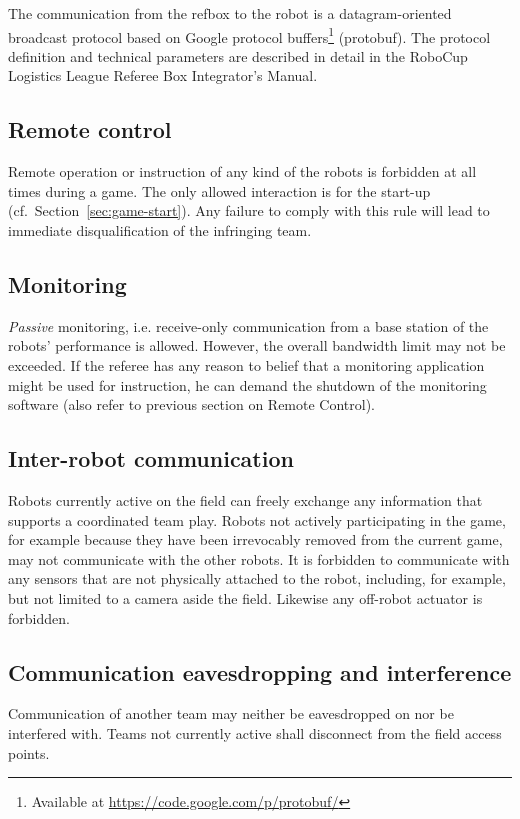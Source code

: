 \documentclass[12pt,twoside]{article}
\newcommand{\refsec}[1]{Section~\ref{#1}}
\begin{document}
The communication from the refbox to the robot is a datagram-oriented
broadcast protocol based on Google protocol buffers\footnote{Available
  at \url{https://code.google.com/p/protobuf/}} (protobuf). The
protocol definition and technical parameters are described in detail
in the RoboCup Logistics League Referee Box Integrator's Manual.

\subsection{Remote control}
\label{sec:remote-control}
Remote operation or instruction of any kind of the robots is forbidden
at all times during a game. The only allowed interaction is for the start-up
(cf.~\refsec{sec:game-start}). Any failure to comply with this rule will lead to
immediate disqualification of the infringing team.

\subsection{Monitoring}
\label{sec:monitoring}
\emph{Passive} monitoring, i.e. receive-only communication from a base
station of the robots' performance is allowed. However, the overall
bandwidth limit may not be exceeded.
If the referee has any reason to belief that a monitoring application
might be used for instruction, he can demand the shutdown of the
monitoring software (also refer to previous section on Remote
Control).

\subsection{Inter-robot communication}
\label{sec:inter-robot-comm}
Robots currently active on the field can freely exchange any
information that supports a coordinated team play. Robots not actively
participating in the game, for example because they have been
irrevocably removed from the current game, may not communicate with
the other robots. It is forbidden to communicate with any sensors that
are not physically attached to the robot, including, for example, but
not limited to a camera aside the field. Likewise any off-robot
actuator is forbidden.

\subsection{Communication eavesdropping and interference}
\label{sec:comm-tampering}
Communication of another team may neither be eavesdropped on nor be
interfered with. Teams not currently active shall disconnect from the
field access points.
\end{document}
